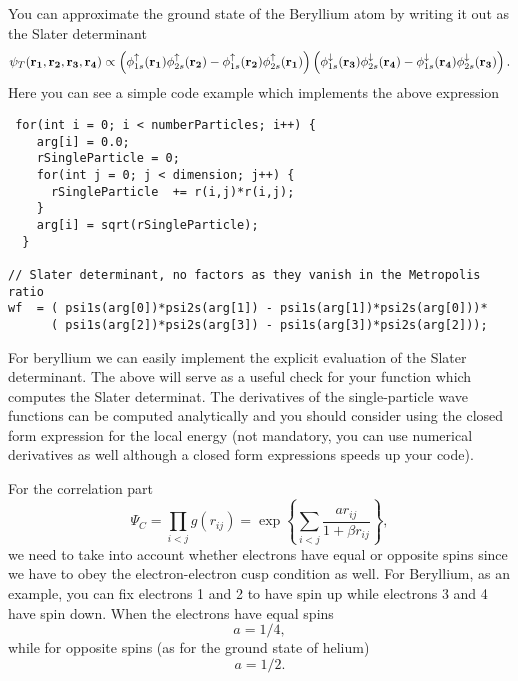 You can approximate the ground state of the Beryllium atom by writing it out as the Slater determinant 
\begin{equation}
   \psi_{T}({\bf r_1},{\bf r_2}, {\bf r_3}, {\bf r_4}) \propto 
\left(\phi_{1s}^\uparrow({\bf r_1})\phi^\uparrow_{2s}({\bf r_2})-\phi^\uparrow_{1s}({\bf r_2})\phi^\uparrow_{2s}({\bf r_1})\right)
\left(\phi^\downarrow_{1s}({\bf r_3})\phi^\downarrow_{2s}({\bf r_4})-\phi^\downarrow_{1s}({\bf r_4})\phi^\downarrow_{2s}({\bf r_3})\right).
\end{equation}
Here you can see a simple code example which implements the above expression
\vspace{12pt}
\begin{lstlisting}
 for(int i = 0; i < numberParticles; i++) {
    arg[i] = 0.0;
    rSingleParticle = 0;
    for(int j = 0; j < dimension; j++) {
      rSingleParticle  += r(i,j)*r(i,j);
    }
    arg[i] = sqrt(rSingleParticle);
  }
  
// Slater determinant, no factors as they vanish in the Metropolis ratio
wf  = ( psi1s(arg[0])*psi2s(arg[1]) - psi1s(arg[1])*psi2s(arg[0]))*
      ( psi1s(arg[2])*psi2s(arg[3]) - psi1s(arg[3])*psi2s(arg[2]));
\end{lstlisting}
\vspace{12pt}
For beryllium we can easily implement the explicit evaluation of the Slater determinant.  The above will serve as a useful check
for your function which computes the Slater determinat. The derivatives of the single-particle wave functions can be computed analytically and you should consider
using the closed form expression for the local energy (not mandatory, you can use numerical derivatives as well although a closed form expressions speeds up your code).

For the correlation part 
\[
\Psi_C=\prod_{i< j}g(r_{ij})= \exp{\left\{\sum_{i<j}\frac{ar_{ij}}{1+\beta r_{ij}}\right\}},
\]
we need to take into account whether electrons have equal or opposite spins since we have to obey the
electron-electron cusp condition as well.  For Beryllium, as an example,  you can fix electrons 1 and 2 to have spin up while
electrons 3 and 4 have spin down.
When the electrons have  equal spins 
\[
a= 1/4,
\]
while for opposite spins (as for the ground state of  helium)
\[
a= 1/2.
\] 

